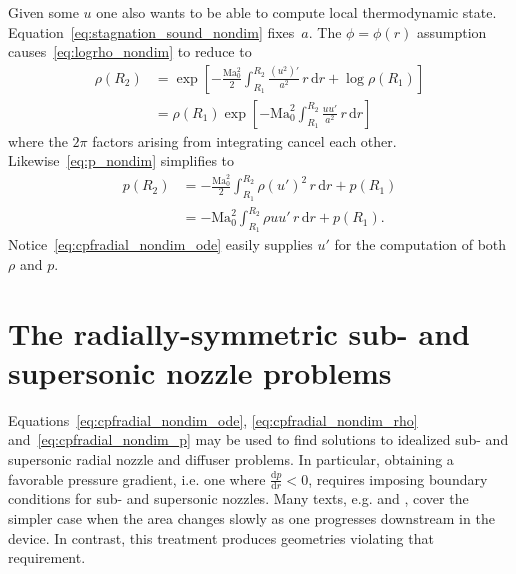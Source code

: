 \documentclass[letterpaper,11pt,nointlimits,reqno]{amsart}
\newcommand{\Mach}[1][]{\mbox{Ma}_{#1}}
\begin{document}
Given some $u$ one also wants to be able to compute local thermodynamic state.
Equation~\eqref{eq:stagnation_sound_nondim} fixes~$a$.  The $\phi=\phi(r)$
assumption causes~\eqref{eq:logrho_nondim} to reduce to
\begin{align}
  \rho\!\left(R_2\right)
  &=
  \exp\left[
    - \frac{\Mach[0]^2}{2} \int_{R_1}^{R_2}
        \frac{\left(u^2\right)'}{a^2}
      \, r \, \mathrm{d}r
    + \log\rho\!\left(R_1\right)
  \right]
\\
  &=
  \rho\!\left(R_1\right) \exp\left[
    - \Mach[0]^2 \int_{R_1}^{R_2}
        \frac{u u'}{a^2}
      \, r \, \mathrm{d}r
  \right]
\label{eq:cpfradial_nondim_rho}
\end{align}
where the $2\pi$ factors arising from integrating cancel each other.
Likewise~\eqref{eq:p_nondim} simplifies to
\begin{align}
  p\!\left(R_2\right)
  &=
    - \frac{\Mach[0]^2}{2} \int_{R_1}^{R_2}
        \rho \left(u'\right)^2
      \, r \, \mathrm{d}r
    + p\!\left(R_1\right)
\\
  &=
    -\Mach[0]^2 \int_{R_1}^{R_2} \rho u u' \, r \, \mathrm{d}r
      + p\!\left(R_1\right)
\label{eq:cpfradial_nondim_p}
.
\end{align}
Notice~\eqref{eq:cpfradial_nondim_ode} easily supplies $u'$ for the computation
of both $\rho$ and $p$.

\section{The radially-symmetric sub- and supersonic nozzle problems}

Equations~\eqref{eq:cpfradial_nondim_ode}, \eqref{eq:cpfradial_nondim_rho}
and~\eqref{eq:cpfradial_nondim_p} may be used to find solutions to idealized
sub- and supersonic radial nozzle and diffuser problems.  In particular,
obtaining a favorable pressure gradient, i.e. one where
$\frac{\mathrm{d}p}{\mathrm{d}r} < 0$, requires imposing boundary conditions
for sub- and supersonic nozzles.  Many texts, e.g.
\citet[\textsection{}9.4]{White1999Fluid} and
\citet[\textsection{}97]{Landau2004Fluid}, cover the simpler case when the area
changes slowly as one progresses downstream in the device.  In contrast, this
treatment produces geometries violating that requirement.
\end{document}
